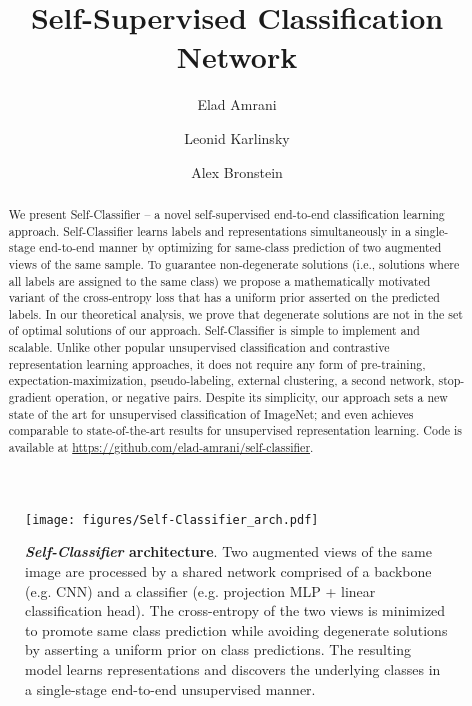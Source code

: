 \documentclass[runningheads]{llncs}
\begin{document}
\pagestyle{headings}
\mainmatter
\def\ECCVSubNumber{4857}  

\title{Self-Supervised Classification Network} 

\begin{comment}
\titlerunning{ECCV-22 submission ID \ECCVSubNumber} 
\authorrunning{ECCV-22 submission ID \ECCVSubNumber} 
\author{Anonymous ECCV submission}
\institute{Paper ID \ECCVSubNumber}
\end{comment}


\author{Elad Amrani \and
Leonid Karlinsky \and
Alex Bronstein}

\maketitle

\begin{abstract}
We present Self-Classifier -- a novel self-supervised end-to-end classification learning approach. Self-Classifier learns labels and representations simultaneously in a single-stage end-to-end manner by optimizing for same-class prediction of two augmented views of the same sample. To guarantee non-degenerate solutions (i.e., solutions where all labels are assigned to the same class) we propose a mathematically motivated variant of the cross-entropy loss that has a uniform prior asserted on the predicted labels. In our theoretical analysis, we prove that degenerate solutions are not in the set of optimal solutions of our approach. Self-Classifier is simple to implement and scalable. Unlike other popular unsupervised classification and contrastive representation learning approaches, it does not require any form of pre-training, expectation-maximization, pseudo-labeling, external clustering, a second network, stop-gradient operation, or negative pairs. Despite its simplicity, our approach sets a new state of the art for unsupervised classification of ImageNet; and even achieves comparable to state-of-the-art results for unsupervised representation learning. Code is available at \url{https://github.com/elad-amrani/self-classifier}. 
\end{abstract}

\begin{figure}[t]
\begin{center}
  \texttt{[image: figures/Self-Classifier\_arch.pdf]}
\end{center}
  \caption{\textbf{\textit{Self-Classifier} architecture}. Two augmented views of the same image are processed by a shared network comprised of a backbone (e.g. CNN) and a classifier (e.g. projection MLP + linear classification head). The cross-entropy of the two views is minimized to promote same class prediction while avoiding degenerate solutions by asserting a uniform prior on class predictions. The resulting model learns representations and discovers the underlying classes in a single-stage end-to-end unsupervised manner. }
\label{fig:architecture}
\end{figure}
\end{document}
